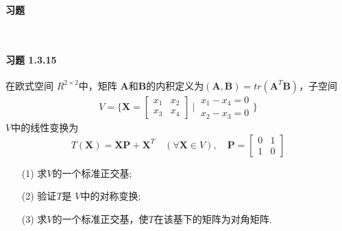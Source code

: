 \documentclass[12pt, a4paper, oneside, fontset=none]{ctexart}
\begin{document}
\centerline{\large{\textbf{习题}}} \ \par

\paragraph*{习题 1.3.15} 在欧式空间 $R^{2\times 2}$中，矩阵 $\bm{A}$和$\bm{B}$的内积定义为$(\bm{A},\bm{B}) = tr(\bm{A}^T\bm{B})$，子空间
\[
    V = \biggl\{\bm{X} = \begin{bmatrix}
        x_1 & x_2 \\
        x_3 & x_4
    \end{bmatrix}\ \bigg| \ \begin{matrix}
        x_1 - x_4 = 0 \\
        x_2 - x_3 = 0
    \end{matrix}\biggr\}
\]
$V$中的线性变换为
\[
    T(\bm{X}) = \bm{XP} + \bm{X}^T \quad (\forall \bm{X} \in V), \quad \bm{P} = \begin{bmatrix}
        0 & 1 \\
        1 & 0
    \end{bmatrix}
\]
\begin{enumerate}
    \item[(1)] 求$V$的一个标准正交基;
    \item[(2)] 验证$T$是 $V$中的对称变换;
    \item[(3)] 求$V$的一个标准正交基，使$T$在该基下的矩阵为对角矩阵.
\end{enumerate}
\end{document}
